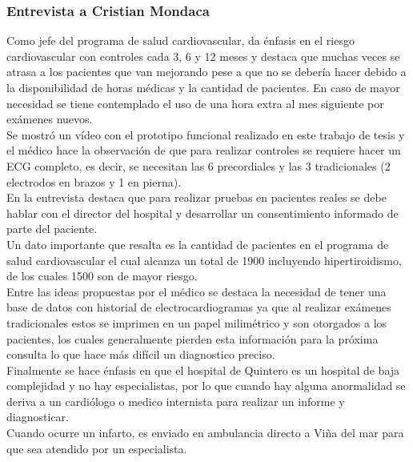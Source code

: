 \subsubsection{Entrevista a Cristian Mondaca}
Como jefe del programa de salud cardiovascular, da énfasis en el riesgo cardiovascular con controles cada 3, 6 y 12 meses y destaca que muchas veces se atrasa a los pacientes que van mejorando pese a que no se debería hacer debido a la disponibilidad de horas médicas y la cantidad de pacientes.
En caso de mayor necesidad se tiene contemplado el uso de una hora extra al mes siguiente por exámenes nuevos.\\
Se mostró un vídeo con el prototipo funcional realizado en este trabajo de tesis y el médico hace la observación de que para realizar controles se requiere hacer un ECG completo, es decir, se necesitan las 6 precordiales y las 3 tradicionales (2 electrodos en brazos y 1 en pierna). \\
En la entrevista destaca que para realizar pruebas en pacientes reales se debe hablar con el director del hospital y desarrollar un consentimiento informado de parte del paciente. \\
Un dato importante que resalta es la cantidad de pacientes en el programa de salud cardiovascular el cual alcanza un total de 1900 incluyendo hipertiroidismo, de los cuales 1500 son de mayor riesgo.\\
Entre las ideas propuestas por el médico se destaca la necesidad de tener una base de datos con historial de electrocardiogramas ya que al realizar exámenes tradicionales estos se imprimen en un papel milimétrico y son otorgados a los pacientes, los cuales generalmente pierden esta información para la próxima consulta lo que hace más difícil un diagnostico preciso.\\
Finalmente se hace énfasis en que el hospital de Quintero es un hospital de baja complejidad y no hay especialistas, por lo que cuando hay alguna anormalidad se deriva a un cardiólogo o medico internista para realizar un informe y diagnosticar.\\
Cuando ocurre un infarto, es enviado en ambulancia directo a Viña del mar para que sea atendido por un especialista.

